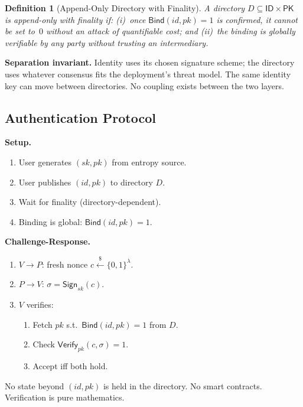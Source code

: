 \documentclass[12pt,a4paper]{article}
\newtheorem{definition}{Definition}
\begin{document}
\begin{definition}[Append-Only Directory with Finality]
\label{def:dir}
A directory $D \subseteq \mathsf{ID} \times \mathsf{PK}$ is
\emph{append-only with finality} if: (i)~once
$\mathsf{Bind}(\mathit{id}, pk) = 1$ is confirmed, it cannot be set
to~$0$ without an attack of quantifiable cost; and (ii)~the binding is
globally verifiable by any party without trusting an intermediary.
\end{definition}

\textbf{Separation invariant.} Identity uses its chosen signature scheme;
the directory uses whatever consensus fits the deployment's threat model.
The same identity key can move between directories. No coupling exists
between the two layers.

\subsection{Authentication Protocol}

\textbf{Setup.}
\begin{enumerate}
  \item User generates $(sk, pk)$ from entropy source.
  \item User publishes $(\mathit{id}, pk)$ to directory $D$.
  \item Wait for finality (directory-dependent).
  \item Binding is global: $\mathsf{Bind}(\mathit{id}, pk) = 1$.
\end{enumerate}

\textbf{Challenge-Response.}
\begin{enumerate}
  \item $V \to P$: fresh nonce $c \xleftarrow{\$} \{0,1\}^\lambda$.
  \item $P \to V$: $\sigma = \mathsf{Sign}_{sk}(c)$.
  \item $V$ verifies:
    \begin{enumerate}
      \item Fetch $pk$ s.t.\ $\mathsf{Bind}(\mathit{id}, pk) = 1$
            from $D$.
      \item Check $\mathsf{Verify}_{pk}(c, \sigma) = 1$.
      \item Accept iff both hold.
    \end{enumerate}
\end{enumerate}

No state beyond $(\mathit{id}, pk)$ is held in the directory. No smart
contracts. Verification is pure mathematics.
\end{document}
